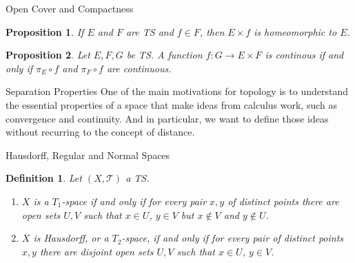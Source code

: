 \documentclass[12pt]{article}
\newtheorem{definition}{Definition}[section]
\newtheorem{proposition}{Proposition}[section]
\begin{document}
\begin{section}{Open Cover and Compactness}
\begin{proposition}
	If $E$ and $F$ are TS and $f\in F$, then $E\times{f}$ is homeomorphic to $E$.
\end{proposition}

\begin{proposition}
	Let $E, F, G$ be TS. A function $f:G\rightarrow E\times F$ is continous if and only if $\pi_E\circ f$ and $\pi_F\circ f$ are continuous.
\end{proposition}



\end{section}


\begin{section}{Separation Properties}
One of the main motivations for topology is to understand the essential properties of a space that make ideas from calculus work, such as convergence and continuity. And in particular, we want to define those ideas without recurring to the concept of distance.

\begin{subsection}{Hausdorff, Regular and Normal Spaces}
\begin{definition}
Let $\left(X, \mathcal{T}\right)$ a TS.
	\begin{enumerate}
		\item $X$ is a $T_{1}$-space if and only if for every pair $x,y$ of distinct points there are open sets $U,V$ such that $x\in U$, $y\in V$ but $x\notin V$ and $y\notin U$.
		\item $X$ is Hausdorff, or a $T_{2}$-space, if and only if for every pair of distinct points $x,y$ there are disjoint open sets $U, V$ such that $x\in U$, $y\in V$.
	\end{enumerate}
\end{definition}
\end{subsection}





\end{section}
\end{document}
